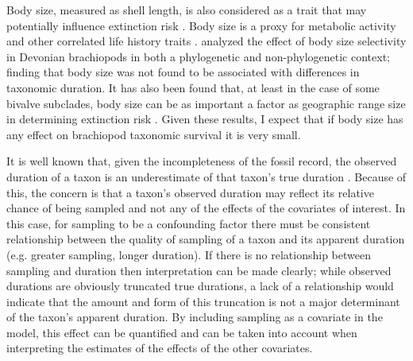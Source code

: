 \documentclass[11pt]{article}
\begin{document}
Body size, measured as shell length, is also considered as a trait that may potentially influence extinction risk \citep{Payne2014,Harnik2011}. Body size is a proxy for metabolic activity and other correlated life history traits \citep{Payne2014}. \citet{Harnik2014} analyzed the effect of body size selectivity in Devonian brachiopods in both a phylogenetic and non-phylogenetic context; finding that body size was not found to be associated with differences in taxonomic duration. It has also been found that, at least in the case of some bivalve subclades, body size can be as important a factor as geographic range size in determining extinction risk \citep{Harnik2011}. Given these results, I expect that if body size has any effect on brachiopod taxonomic survival it is very small.

It is well known that, given the incompleteness of the fossil record, the observed duration of a taxon is an underestimate of that taxon's true duration \citep{Solow1997,Wagner2013a,Wang2004,Liow2010b,Alroy2014a,Foote1996e}. Because of this, the concern is that a taxon's observed duration may reflect its relative chance of being sampled and not any of the effects of the covariates of interest. In this case, for sampling to be a confounding factor there must be consistent relationship between the quality of sampling of a taxon and its apparent duration (e.g. greater sampling, longer duration). If there is no relationship between sampling and duration then interpretation can be made clearly; while observed durations are obviously truncated true durations, a lack of a relationship would indicate that the amount and form of this truncation is not a major determinant of the taxon's apparent duration. By including sampling as a covariate in the model, this effect can be quantified and can be taken into account when interpreting the estimates of the effects of the other covariates.
\end{document}
